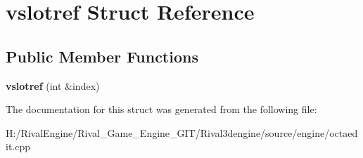 \hypertarget{structvslotref}{}\section{vslotref Struct Reference}
\label{structvslotref}
\subsection*{Public Member Functions}
\begin{DoxyCompactItemize}
\item 
\mbox{\label{structvslotref_a547e09b1417071ff9c8d9f8ea680796a}} 
{\bfseries vslotref} (int \&index)
\end{DoxyCompactItemize}


The documentation for this struct was generated from the following file\+:\begin{DoxyCompactItemize}
\item 
H\+:/\+Rival\+Engine/\+Rival\+\_\+\+Game\+\_\+\+Engine\+\_\+\+G\+I\+T/\+Rival3dengine/source/engine/octaedit.\+cpp\end{DoxyCompactItemize}
